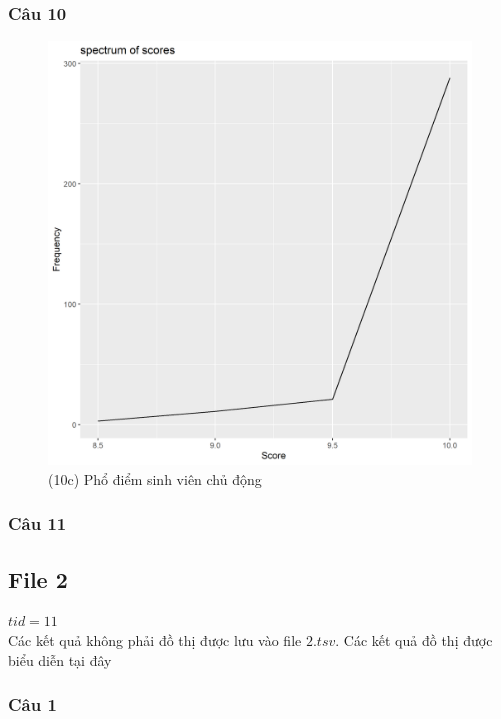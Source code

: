 \documentclass[a4paper]{article}
\theoremstyle{definition}
\begin{document}
\subsubsection{Câu 10}
\newpage
\begin{figure}[!ht]
    \centering
    \includegraphics[scale=0.4]{Pics/q10c_file1.png}
    \caption{(10c) Phổ điểm sinh viên chủ động}
    \label{fig:my_label}
\end{figure}
\newpage
\subsubsection{Câu 11}

\newpage
\subsection{File 2}
\textbf{$tid = 11$}\\
Các kết quả không phải đồ thị được lưu vào file $2.tsv$. Các kết quả đồ thị được biểu diễn tại đây
\subsubsection{Câu 1}
\end{document}
